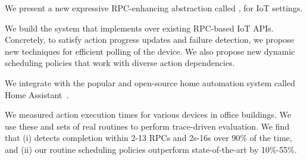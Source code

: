 \squishlist
\item We present a new expressive RPC-enhancing abstraction called \abs, for IoT settings.
\item We build the \sysname{} system that implements \abs{} over existing RPC-based IoT APIs. Concretely, to satisfy action progress updates and failure detection, we propose new techniques for efficient polling of the device. We also propose new dynamic scheduling policies that work with diverse action dependencies.
\item We integrate \sysname{}
with the popular and open-source home automation system called Home Assistant~\cite{HomeAssistant}.
\item We measured action execution times for various devices in office buildings. 
We use these and sets of real routines to perform trace-driven evaluation. We find that (i) \sysname{} 
detects completion within 2-13 RPCs and 2s-16s over 90\% of the time, and (ii)
our routine scheduling policies outperform state-of-the-art by 10\%-55\%.

\squishend
